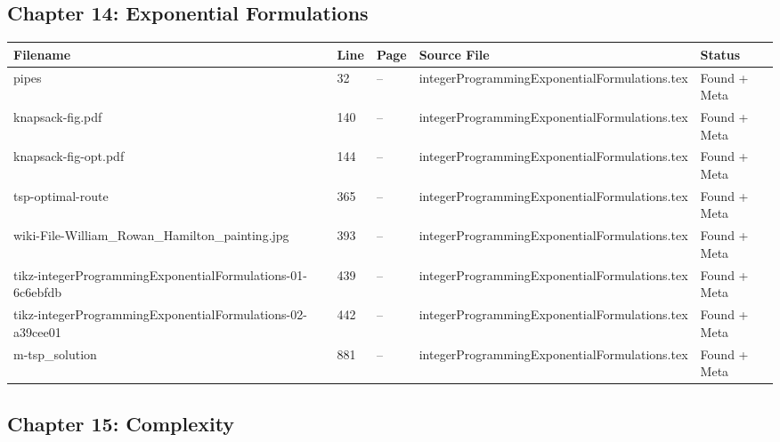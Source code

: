 \documentclass[11pt]{article}
\begin{document}
\subsection{Chapter 14: Exponential Formulations}



\begin{longtable}{|p{3.5cm}|p{1.5cm}|p{1cm}|p{4cm}|p{2cm}|}
\hline
\textbf{Filename} & \textbf{Line} & \textbf{Page} & \textbf{Source File} & \textbf{Status} \\
\hline
\endhead

pipes & 32 & -- & integerProgrammingExponentialFormulations.tex & \textcolor{found}{Found + Meta} \\
\hline

knapsack-fig.pdf & 140 & -- & integerProgrammingExponentialFormulations.tex & \textcolor{found}{Found + Meta} \\
\hline

knapsack-fig-opt.pdf & 144 & -- & integerProgrammingExponentialFormulations.tex & \textcolor{found}{Found + Meta} \\
\hline

tsp-optimal-route & 365 & -- & integerProgrammingExponentialFormulations.tex & \textcolor{found}{Found + Meta} \\
\hline

wiki-File-William\_Rowan\_Hamilton\_painting.jpg & 393 & -- & integerProgrammingExponentialFormulations.tex & \textcolor{found}{Found + Meta} \\
\hline

tikz-integerProgrammingExponentialFormulations-01-6c6ebfdb & 439 & -- & integerProgrammingExponentialFormulations.tex & \textcolor{found}{Found + Meta} \\
\hline

tikz-integerProgrammingExponentialFormulations-02-a39cee01 & 442 & -- & integerProgrammingExponentialFormulations.tex & \textcolor{found}{Found + Meta} \\
\hline

m-tsp\_solution & 881 & -- & integerProgrammingExponentialFormulations.tex & \textcolor{found}{Found + Meta} \\
\hline

\end{longtable}


\subsection{Chapter 15: Complexity}
\end{document}
